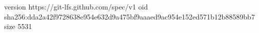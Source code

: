 version https://git-lfs.github.com/spec/v1
oid sha256:dda2a42f9728638e954e632d9a475bf9aaaed9ac954e152ed571b12b88589bb7
size 5531
